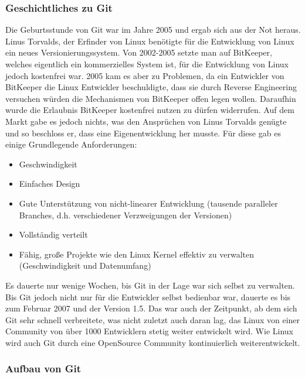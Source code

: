 \subsubsection{Geschichtliches zu Git}
Die Geburtsstunde von Git war im Jahre 2005 und ergab sich aus der Not heraus. Linus Torvalds, der Erfinder von Linux benötigte für die Entwicklung von Linux ein neues Versionierungssystem. Von 2002-2005 setzte man auf BitKeeper, welches eigentlich ein kommerzielles System ist, für die Entwicklung von Linux jedoch kostenfrei war. 2005 kam es aber zu Problemen, da ein Entwickler von BitKeeper die Linux Entwickler beschuldigte, dass sie durch Reverse Engineering versuchen würden die Mechanismen von BitKeeper offen legen wollen\autocite[11]{Git}. Daraufhin wurde die Erlaubnis BitKeeper kostenfrei nutzen zu dürfen widerrufen. 
Auf dem Markt gabe es jedoch nichts, was den Ansprüchen von Linus Torvalds genügte und so beschloss er, dass eine Eigenentwicklung her musste. Für diese gab es einige Grundlegende Anforderungen\autocite[31]{PGit}:
\begin{itemize}
\itemsep-8pt
\item Geschwindigkeit
\item Einfaches Design
\item Gute Unterstützung von nicht-linearer Entwicklung (tausende paralleler Branches, d.h. verschiedener Verzweigungen der Versionen)
\item Vollständig verteilt
\item Fähig, große Projekte wie den Linux Kernel effektiv zu verwalten (Geschwindigkeit und Datenumfang)
\end{itemize}
Es dauerte nur wenige Wochen, bis Git in der Lage war sich selbst zu verwalten. Bis Git jedoch nicht nur für die Entwickler selbst bedienbar war, dauerte es bis zum Februar 2007 und der Version 1.5. Das war auch der Zeitpunkt, ab dem sich Git sehr schnell verbreitete, was nicht zuletzt auch daran lag, das Linux von einer Community von über 1000 Entwicklern stetig weiter entwickelt wird. Wie Linux wird auch Git durch eine OpenSource Community kontinuierlich weiterentwickelt.

\subsubsection{Aufbau von Git}
